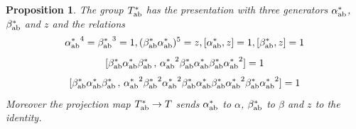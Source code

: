 \documentclass[twoside]{irmaems}
\theoremstyle{plain}
\newtheorem{proposition}[theorem]{Proposition}
\theoremstyle{definition}
\theoremstyle{remark}
\begin{document}
\begin{proposition}\label{abelcar}
The group $T^*_{\rm ab}$ has the presentation with three generators 
$\alpha^*_{\rm ab}$, $\beta^*_{\rm ab}$ and $z$ and the relations 
\[ {\alpha^*_{\rm ab}}^4={\beta^*_{\rm ab}}^3=1, (\beta^*_{\rm ab}\alpha^*_{\rm ab})^5=z, 
[\alpha^*_{\rm ab}, z]=1, [\beta^*_{\rm ab}, z]=1\]
\[ [\beta^*_{\rm ab}\alpha^*_{\rm ab}\beta^*_{\rm ab} \, , \, {\alpha^*_{\rm ab}}^2\beta^*_{\rm ab}\alpha^*_{\rm ab}\beta^*_{\rm ab}{\alpha^*_{\rm ab}}^2]=1\]
\[[\beta^*_{\rm ab}\alpha^*_{\rm ab}\beta^*_{\rm ab} \, , \, {\alpha^*_{\rm ab}}^2{\beta^*_{\rm ab}}^2 
{\alpha^*_{\rm ab}}^2\beta^*_{\rm ab}\alpha^*_{\rm ab}\beta^*_{\rm ab}{\alpha^*_{\rm ab}}^2{\beta^*_{\rm ab}}
{\alpha^*_{\rm ab}}^2]=1\]
Moreover the projection map $T^*_{\rm ab}\to T$ sends $\alpha^*_{\rm ab}$ to $\alpha$, 
$\beta^*_{\rm ab}$ to $\beta$ and $z$ to the identity.  
\end{proposition}
\end{document}
